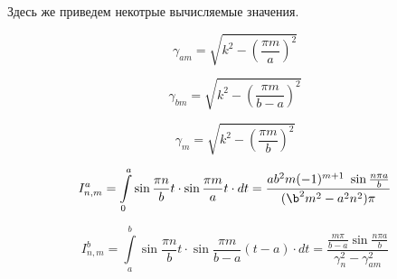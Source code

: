 Здесь же приведем некотрые вычисляемые значения.

$$
	\gamma_{am} = \sqrt{k^2 - \left(\frac{\pi m}{a}\right)^2}
$$

$$
	\gamma_{bm} = \sqrt{k^2 - \left(\frac{\pi m}{b-a}\right)^2}
$$

$$
	\gamma_{m} = \sqrt{k^2 - \left(\frac{\pi m}{b}\right)^2}
$$

$$
	I^a_{n,m} = \int\limits_0^a\sin{\frac{\pi n}{b}t} \cdot \sin{\frac{\pi m}{a}t} \cdot dt = \frac{ab^2m(-1)^{m+1}\ \sin{\frac{n \pi a}{b}}}{(\b^2m^2 - a^2n^2)\pi}
$$

$$
	I^b_{n,m} = \int\limits_a^b\sin{\frac{\pi n}{b}t} \cdot \sin{\frac{\pi m}{b-a}(t-a)} \cdot dt = \frac{\frac{m \pi}{b-a} \sin{\frac{n \pi a}{b}}}{\gamma^2_n - \gamma^2_{am}}
$$